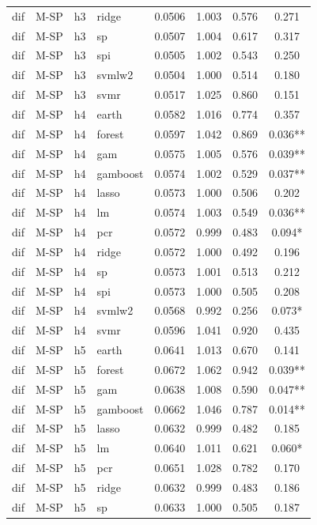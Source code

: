 \begin{ThreePartTable}
\begin{longtable}[t]{llclcccc}
dif & M-SP & h3 & ridge & 0.0506 & 1.003 & 0.576 & 0.271\\
dif & M-SP & h3 & sp & 0.0507 & 1.004 & 0.617 & 0.317\\
dif & M-SP & h3 & spi & 0.0505 & 1.002 & 0.543 & 0.250\\
dif & M-SP & h3 & svmlw2 & 0.0504 & 1.000 & 0.514 & 0.180\\
dif & M-SP & h3 & svmr & 0.0517 & 1.025 & 0.860 & 0.151\\
\addlinespace
dif & M-SP & h4 & earth & 0.0582 & 1.016 & 0.774 & 0.357\\
dif & M-SP & h4 & forest & 0.0597 & 1.042 & 0.869 & 0.036**\\
dif & M-SP & h4 & gam & 0.0575 & 1.005 & 0.576 & 0.039**\\
dif & M-SP & h4 & gamboost & 0.0574 & 1.002 & 0.529 & 0.037**\\
dif & M-SP & h4 & lasso & 0.0573 & 1.000 & 0.506 & 0.202\\
dif & M-SP & h4 & lm & 0.0574 & 1.003 & 0.549 & 0.036**\\
dif & M-SP & h4 & pcr & 0.0572 & 0.999 & 0.483 & 0.094*\\
dif & M-SP & h4 & ridge & 0.0572 & 1.000 & 0.492 & 0.196\\
dif & M-SP & h4 & sp & 0.0573 & 1.001 & 0.513 & 0.212\\
dif & M-SP & h4 & spi & 0.0573 & 1.000 & 0.505 & 0.208\\
dif & M-SP & h4 & svmlw2 & 0.0568 & 0.992 & 0.256 & 0.073*\\
dif & M-SP & h4 & svmr & 0.0596 & 1.041 & 0.920 & 0.435\\
\addlinespace
dif & M-SP & h5 & earth & 0.0641 & 1.013 & 0.670 & 0.141\\
dif & M-SP & h5 & forest & 0.0672 & 1.062 & 0.942 & 0.039**\\
dif & M-SP & h5 & gam & 0.0638 & 1.008 & 0.590 & 0.047**\\
dif & M-SP & h5 & gamboost & 0.0662 & 1.046 & 0.787 & 0.014**\\
dif & M-SP & h5 & lasso & 0.0632 & 0.999 & 0.482 & 0.185\\
dif & M-SP & h5 & lm & 0.0640 & 1.011 & 0.621 & 0.060*\\
dif & M-SP & h5 & pcr & 0.0651 & 1.028 & 0.782 & 0.170\\
dif & M-SP & h5 & ridge & 0.0632 & 0.999 & 0.483 & 0.186\\
dif & M-SP & h5 & sp & 0.0633 & 1.000 & 0.505 & 0.187\\

\end{longtable}
\end{ThreePartTable}
